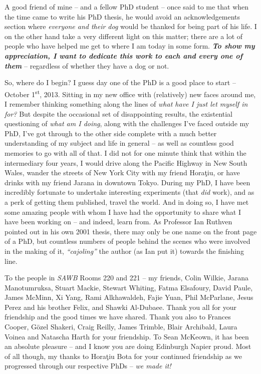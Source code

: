 \begin{preamble}
A good friend of mine -- and a fellow PhD student -- once said to me that when the time came to write his PhD thesis, he would avoid an acknowledgements section where \emph{everyone and their dog} would be thanked for being part of his life. I on the other hand take a very different light on this matter; there are a lot of people who have helped me get to where I am today in some form. \textbf{\emph{To show my appreciation, I want to dedicate this work to each and every one of them}} -- regardless of whether they have a dog or not.

So, where do I begin? I guess day one of the PhD is a good place to start -- October 1\textsuperscript{st}, 2013. Sitting in my new office with (relatively) new faces around me, I remember thinking something along the lines of \emph{what have I just let myself in for?} But despite the occasional set of disappointing results, the existential questioning of \emph{what am I doing}, along with the challenges I've faced outside my PhD, I've got through to the other side complete with a much better understanding of my subject and life in general -- as well as countless good memories to go with all of that. I did not for one minute think that within the intermediary four years, I would drive along the Pacific Highway in New South Wales, wander the streets of New York City with my friend Hora\c{t}iu, or have drinks with my friend Jarana in downtown Tokyo. During my PhD, I have been incredibly fortunate to undertake interesting experiments (that \emph{did} work), and as a perk of getting them published, travel the world. And in doing so, I have met some amazing people with whom I have had the opportunity to share what I have been working on -- and indeed, learn from. As Professor Ian Ruthven pointed out in his own 2001 thesis, there may only be one name on the front page of a PhD, but countless numbers of people behind the scenes who were involved in the making of it, \emph{``cajoling''} the author (as Ian put it) towards the finishing line.

To the people in \emph{SAWB} Rooms 220 and 221 -- my friends, Colin Wilkie, Jarana Manotumruksa, Stuart Mackie, Stewart Whiting, Fatma Elsafoury, David Paule, James McMinn, Xi Yang, Rami Alkhawaldeh, Fajie Yuan, Phil McParlane, Jesus Perez and his brother Felix, and Shawki Al-Dubaee. Thank you all for your friendship and the good times we have shared. Thank you also to Frances Cooper, G\"{o}zel Shakeri, Craig Reilly, James Trimble, Blair Archibald, Laura Voinea and Natascha Harth for your friendship. To Sean McKeown, it has been an absolute pleasure -- and I know you are doing Edinburgh Napier proud. Most of all though, my thanks to Hora\c{t}iu Bota for your continued friendship as we progressed through our respective PhDs -- \emph{we made it!}


\end{preamble}

